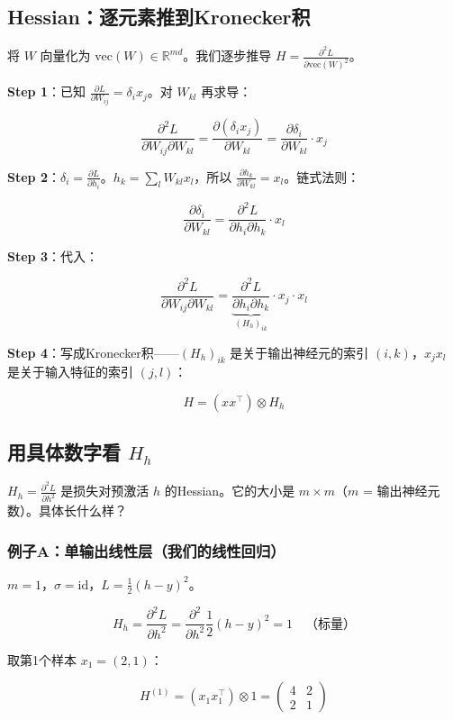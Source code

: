 \documentclass[12pt,a4paper]{article}
\begin{document}
\subsection{Hessian：逐元素推到Kronecker积}

将 $W$ 向量化为 $\text{vec}(W) \in \mathbb{R}^{md}$。我们逐步推导 $H = \frac{\partial^2 L}{\partial \text{vec}(W)^2}$。

\textbf{Step 1}：已知 $\frac{\partial L}{\partial W_{ij}} = \delta_i x_j$。对 $W_{kl}$ 再求导：


\[\frac{\partial^2 L}{\partial W_{ij} \partial W_{kl}} = \frac{\partial(\delta_i x_j)}{\partial W_{kl}} = \frac{\partial \delta_i}{\partial W_{kl}} \cdot x_j\]

\textbf{Step 2}：$\delta_i = \frac{\partial L}{\partial h_i}$。$h_k = \sum_l W_{kl}x_l$，所以 $\frac{\partial h_k}{\partial W_{kl}} = x_l$。链式法则：


\[\frac{\partial \delta_i}{\partial W_{kl}} = \frac{\partial^2 L}{\partial h_i \partial h_k} \cdot x_l\]

\textbf{Step 3}：代入：


\[\frac{\partial^2 L}{\partial W_{ij} \partial W_{kl}} = \underbrace{\frac{\partial^2 L}{\partial h_i \partial h_k}}_{(H_h)_{ik}} \cdot x_j \cdot x_l\]

\textbf{Step 4}：写成Kronecker积——$(H_h)_{ik}$ 是关于输出神经元的索引 $(i,k)$，$x_j x_l$ 是关于输入特征的索引 $(j,l)$：


\[\boxed{H = (xx^\top) \otimes H_h}\]


\subsection{用具体数字看 $H_h$}

$H_h = \frac{\partial^2 L}{\partial h^2}$ 是损失对预激活 $h$ 的Hessian。它的大小是 $m \times m$（$m$ = 输出神经元数）。具体长什么样？


\subsubsection{例子A：单输出线性层（我们的线性回归）}

$m = 1$，$\sigma = \text{id}$，$L = \frac{1}{2}(h - y)^2$。


\[H_h = \frac{\partial^2 L}{\partial h^2} = \frac{\partial^2}{\partial h^2}\frac{1}{2}(h-y)^2 = 1 \quad \text{（标量）}\]

取第1个样本 $x_1 = (2, 1)$：


\[H^{(1)} = (x_1 x_1^\top) \otimes 1 = \begin{pmatrix}4&2\\2&1\end{pmatrix}\]
\end{document}
